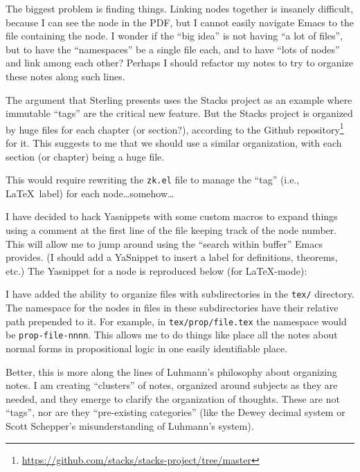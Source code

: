 \begin{node}\label{amn-0005}%
The biggest problem is finding things. Linking nodes together is
insanely difficult, because I can see the node in the PDF, but I cannot
easily navigate Emacs to the file containing the node. I wonder if the
``big idea'' is not having ``a lot of files'', but to have the
``namespaces'' be a single file each, and to have ``lots of nodes'' and
link among each other? Perhaps I should refactor my notes to try to
organize these notes along such lines.

The argument that Sterling presents uses the Stacks project as an
example where immutable ``tags'' are the critical new feature. But the
Stacks project is organized by huge files for each chapter (or
section?), according to the Github repository\footnote{\url{https://github.com/stacks/stacks-project/tree/master}} for it.
This suggests to me that we should use a similar organization, with each
section (or chapter) being a huge file.

This would require rewriting the \verb|zk.el| file to manage the ``tag''
(i.e., \LaTeX\ label) for each node\dots somehow\dots

\begin{node}\label{amn-0006}%
I have decided to hack Yasnippets with some custom macros to expand
things using a comment at the first line of the file keeping track of
the node number. This will allow me to jump around using the ``search
within buffer'' Emacs provides. (I should add a YaSnippet to insert a
label for definitions, theorems, etc.) The Yasnippet for a node is reproduced
below (for \LaTeX-mode):

\end{node}
\end{node}

\begin{node}\label{amn-0007}%
I have added the ability to organize files with subdirectories in the
\verb|tex/| directory. The namespace for the nodes in files in these
subdirectories have their relative path prepended to it. For example, in
\verb|tex/prop/file.tex| the namespace would be \texttt{prop-file-nnnn}.
This allows me to do things like place all the notes about normal forms
in propositional logic in one easily identifiable place.

Better, this is more along the lines of Luhmann's philosophy about
organizing notes. I am creating ``clusters'' of notes, organized around
subjects as they are needed, and they emerge to clarify the organization
of thoughts. These are not ``tags'', nor are they ``pre-existing
categories'' (like the Dewey decimal system or Scott Schepper's
misunderstanding of Luhmann's system).
\end{node}

